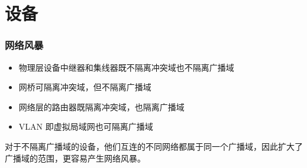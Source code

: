 
\chapter{设备}



\subsection{网络风暴}
\begin{itemize}
    \item 物理层设备中继器和集线器既不隔离冲突域也不隔离广播域
    \item 网桥可隔离冲突域，但不隔离广播域
    \item 网络层的路由器既隔离冲突域，也隔离广播域
    \item VLAN 即虚拟局域网也可隔离广播域
\end{itemize}
对于不隔离广播域的设备，他们互连的不同网络都属于同一个广播域，因此扩大了广播域的范围，更容易产生网络风暴。
